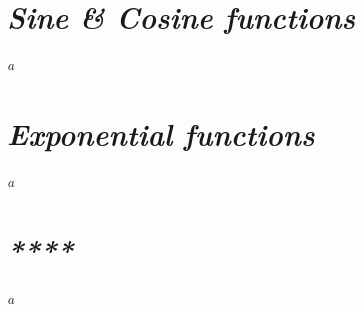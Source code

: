 

\section{\textit{Sine \& Cosine functions}}

	\textit{a}

\section{\textit{Exponential functions}}

	\textit{a}

\section{\textit{****}}

	\textit{a}
